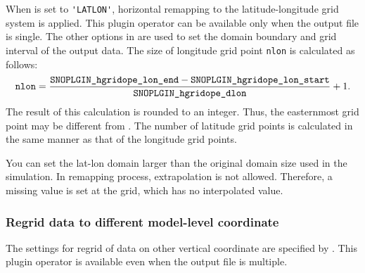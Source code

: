 When  is set to \verb|'LATLON'|,
horizontal remapping to the latitude-longitude grid system is applied.
This plugin operator can be available only when the output file is single.
The other options in 
are used to set the domain boundary and grid interval of the output data.
The size of longitude grid point \verb|nlon| is calculated as follows:
\begin{eqnarray}
  \nmitemeq{nlon} = \frac{\nmitemeq{SNOPLGIN_hgridope_lon_end} - \nmitemeq{SNOPLGIN_hgridope_lon_start} }{\nmitemeq{SNOPLGIN_hgridope_dlon}} + 1\nonumber.
\end{eqnarray}
\noindent
The result of this calculation is rounded to an integer.
Thus, the easternmost grid point may be different from .
The number of latitude grid points is calculated in the same manner as that of the longitude grid points.

You can set the lat-lon domain larger than the original domain size used in the simulation.
In remapping process, extrapolation is not allowed.
Therefore, a missing value is set at the grid, which has no interpolated value.

\subsubsection{Regrid data to different model-level coordinate}

The settings for regrid of data on other vertical coordinate are specified by .
This plugin operator is available even when the output file is multiple.

%

